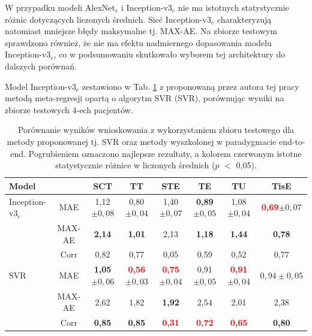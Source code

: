 W przypadku modeli AlexNet$_{e}$ i Inception-v3$_{e}$ nie ma istotnych statystycznie różnic dotyczących liczonych średnich. Sieć Inception-v3$_{e}$ charakteryzują natomiast mniejsze błędy maksymalne tj. MAX-AE. Na zbiorze testowym sprawdzono również, że nie ma efektu nadmiernego dopasowania modelu Inception-v3$_{e}$, co w podsumowaniu skutkowało wyborem tej architektury do dalszych porównań.

Model Inception-v3$_{e}$ zestawiono w Tab. \ref{tab:end-to-end_testset} z proponowaną przez autora tej pracy metodą meta-regresji opartą o algorytm SVR (SVR), porównując wyniki na zbiorze testowych 4-ech pacjentów.  
\vspace{10px}
\renewcommand{\arraystretch}{1.2}
\begin{table}[h]
	\caption{Porównanie wyników wnioskowania z wykorzystaniem zbioru testowego dla metody proponowanej tj. SVR oraz metody wyszkolonej w paradygmacie end-to-end. Pogrubieniem oznaczono najlepsze rezultaty, a kolorem czerwonym istotne statystycznie różnice w liczonych średnich ($p$ $<$ 0,05).}
	\scriptsize
	\begin{center}
		\begin{tabular}{lc||c|c|c|c|c|c}
			\textbf{Model} & & \textbf{SCT} & \textbf{TT} & \textbf{STE} & \textbf{TE} & \textbf{TU} & \textbf{TisE}\\ \hline \hline
			Inception-v3$_{e}$ & MAE & 1,12$\pm{0,08}$ & 0,80$\pm{0,04}$ & 1,40$\pm{0,07}$ & \textbf{0,89}$\pm{0,05}$ & 1,08$\pm{0,04}$ & \textcolor{red}{\textbf{0,69}}$\pm{0,07}$ \\
			& MAX-AE & \textbf{2,14} & \textbf{1,01} & 2,13 & \textbf{1,18} & \textbf{1,44} & \textbf{0,78} \\
			& Corr & 0,82 & 0,77 & 0,05 & 0,59 & 0,52 & 0,77 \\ \hline
			SVR & MAE & \textbf{1,05}$\pm0,06$ & \textcolor{red}{\textbf{0,56}}$\pm0,03$ & \textcolor{red}{\textbf{0,75}}$\pm0,04$ & 0,91$\pm0,05$ & \textcolor{red}{\textbf{0,91}}$\pm0,04$ & $0,94\pm0,05$\\
			& MAX-AE & 2,62 & 1,82 & \textbf{1,92} & 2,54 & 2,01 & 2,38 \\
			& Corr & \textbf{0,85} & \textbf{0,85} & \textcolor{red}{\textbf{0,31}} & \textcolor{red}{\textbf{0,72}} & \textcolor{red}{\textbf{0,65}} & \textbf{0,80} 
		\end{tabular}
	\end{center}
	\label{tab:end-to-end_testset}
\end{table}
\renewcommand{\arraystretch}{1}

